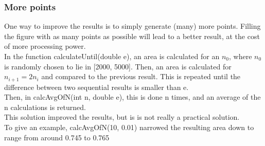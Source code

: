 \documentclass[11pt, a4paper, titlepage, openright]{article}
\begin{document}
        \subsubsection{More points}
        \label{sec:morep}
            One way to improve the results is to simply generate (many) more points. Filling the figure with as many points as possible will lead to a better
            result, at the cost of more processing power. \\
            In the function calculateUntil(double e), an area is calculated for an \(n_0\), where \(n_0\) is randomly chosen to lie in [2000, 5000]. Then, 
            an area is calculated for \(n_{i+1} = 2n_i\) and compared to the previous result. This is repeated until the difference between two 
            sequential results is smaller than e. \\
            Then, in calcAvgOfN(int n, double e), this is done n times, and an average of the n calculations is returned. \\
            This solution improved the results, but is is not really a practical solution. \\
            To give an example, calcAvgOfN(10, 0.01) narrowed the resulting area down to range from around 0.745 to 0.765 
\end{document}
